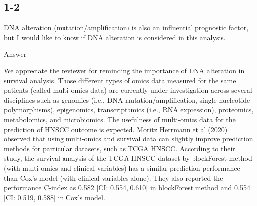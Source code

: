 \documentclass[preprint,12pt]{elsarticle}
\newenvironment{MyColorPar}[1]{%
    \leavevmode\color{#1}\ignorespaces%
}{%
}%
\begin{document}
\subsection*{1-2}
DNA alteration (mutation/amplification) is also an influential prognostic factor, but I would like to know if DNA alteration is considered in this analysis.

\begin{MyColorPar}{blue}
Answer

We appreciate the reviewer for reminding the importance of DNA alteration in survival analysis.
Those different types of omics data measured for the same patients (called multi-omics data) are currently under investigation across several disciplines such as genomics (i.e., DNA mutation/amplification, single nucleotide polymorphisms), %
epigenomics, transcriptomics (i.e., RNA expression), proteomics, metabolomics, and microbiomics.
The usefulness of multi-omics data for the prediction of HNSCC outcome is expected.
Moritz Herrmann et al.(2020) observed that using multi-omics and survival data can slightly improve prediction methods for particular datasets, such as TCGA HNSCC\cite{Herrmann2020}.
According to their study, %
the survival analysis of the TCGA HNSCC dataset by blockForest method (with multi-omics and clinical variables) has a similar prediction performance than Cox's model (with clinical variables alone). %
They also reported the performance C-index as 0.582 [CI: 0.554, 0.610] in blockForest method and 0.554 [CI: 0.519, 0.588] in Cox's model\cite{Herrmann2020}.


\end{MyColorPar}
\end{document}
